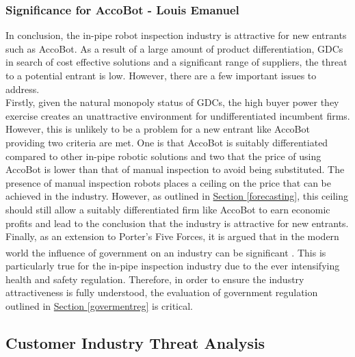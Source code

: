 \documentclass[11pt]{article}		%
\newcommand{\supercite}[1]{\textsuperscript{\cite{#1}}}		%
\newcommand{\sectref}[1]{\hyperref[#1]{Section \ref*{#1}}}     %
\begin{document}
			\subsubsection{Significance for AccoBot - Louis Emanuel}
			
				In conclusion, the in-pipe robot inspection industry is attractive for new entrants such as AccoBot. As a result of a large amount of product differentiation, GDCs in search of cost effective solutions and a significant range of suppliers, the threat to a potential entrant is low. However, there are a few important issues to address. 
				\\
				\hspace*{3ex}Firstly, given the natural monopoly status of GDCs, the high buyer power they exercise creates an unattractive environment for undifferentiated incumbent firms. However, this is unlikely to be a problem for a new entrant like AccoBot providing two criteria are met. One is that AccoBot is suitably differentiated compared to other in-pipe robotic solutions and two that the price of using AccoBot is lower than that of manual inspection to avoid being substituted. The presence of manual inspection robots places a ceiling on the price that can be achieved in the industry. However, as outlined in \sectref{forecasting}, this ceiling should still allow a suitably differentiated firm like AccoBot to earn economic profits and lead to the conclusion that the industry is attractive for new entrants. 
				\\
                \hspace*{3ex}Finally, as an extension to Porter's Five Forces, it is argued that in the modern world the influence of government on an industry can be significant \supercite{GovHBR}. This is particularly true for the in-pipe inspection industry due to the ever intensifying health and safety regulation. Therefore, in order to ensure the industry attractiveness is fully understood, the evaluation of government regulation outlined in \sectref{govermentreg} is critical. 
			    
	\subsection{Customer Industry Threat Analysis}\label{customerIndustry}
	
\end{document}
